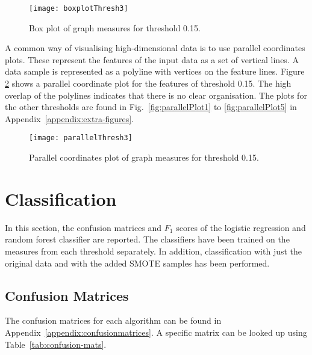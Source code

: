 		\begin{figure}
			\centering
		    \texttt{[image: boxplotThresh3]}
		    \caption{Box plot of graph measures for threshold 0.15.}
		    \label{fig:boxPlot3}
		\end{figure}
		

		A common way of visualising high-dimensional data is to use parallel coordinates plots. These represent the features of the input data as a set of vertical lines. A data sample is represented as a polyline with vertices on the feature lines. Figure \ref{fig:parallelPlot3} shows a parallel coordinate plot for the features of threshold 0.15. The high overlap of the polylines indicates that there is no clear organisation. The plots for the other thresholds are found in Fig.~\ref{fig:parallelPlot1} to \ref{fig:parallelPlot5} in Appendix~\ref{appendix:extra-figures}.

		\begin{figure}
			\centering
		    \texttt{[image: parallelThresh3]}
		    \caption{Parallel coordinates plot of graph measures for threshold 0.15.}
		    \label{fig:parallelPlot3}
		\end{figure}


	\section{Classification}
	In this section, the confusion matrices and \(F_1\) scores of the logistic regression and random forest classifier are reported. The classifiers have been trained on the measures from each threshold separately. In addition, classification with just the original data and with the added \ac{SMOTE} samples has been performed.

		\subsection{Confusion Matrices}
				
		The confusion matrices for each algorithm can be found in Appendix~\ref{appendix:confusionmatrices}. A specific matrix can be looked up using Table~\ref{tab:confusion-mats}. 

